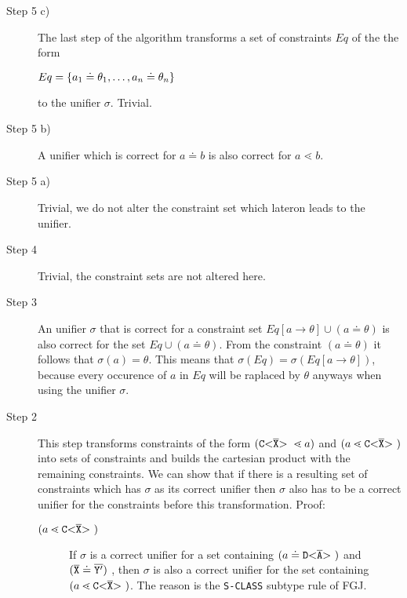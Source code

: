 \documentclass[runningheads]{llncs}
\begin{document}
\begin{description}
\item[Step 5 c)]
The last step of the algorithm transforms a set of constraints $Eq$ of the the form

$Eq = \{ a_1 \doteq \theta_1, \ldots , a_n \doteq \theta_n \}$

to the unifier $\sigma$.
Trivial.

\item[Step 5 b)]
A unifier which is correct for $a \doteq b$ is also correct for $a \lessdot b$.

\item[Step 5 a)]
Trivial, we do not alter the constraint set which lateron leads to the unifier.

\item[Step 4]
Trivial, the constraint sets are not altered here.

\item[Step 3]
An unifier $\sigma$ that is correct for a constraint set
$Eq[a \to \theta] \cup (a \doteq \theta)$ is also correct for
the set $Eq \cup (a \doteq \theta)$.
From the constraint $(a \doteq \theta)$ it follows that $\sigma(a) = \theta$.
This means that $\sigma(Eq) = \sigma(Eq[a \to \theta])$,
because every occurence of $a$ in $Eq$ will be raplaced by $\theta$ anyways when using the unifier $\sigma$.

\item[Step 2]
This step transforms constraints of the form $(\mathtt{C {\tt <} \overline{\tt X} {\tt >} \ } \lessdot a)$ and $(a \lessdot \mathtt{C {\tt <} \overline{\tt X} {\tt >} \ })$
into sets of constraints and builds the cartesian product with the remaining constraints.
We can show that if there is a resulting set of constraints which has $\sigma$ as its correct unifier
then $\sigma$ also has to be a correct unifier for the constraints before this transformation.
Proof:

\begin{description}
\item[$(a \lessdot \mathtt{C {\tt <} \overline{\tt X} {\tt >} \ })$] If $\sigma$ is a correct unifier for a set containing $(a \doteq \mathtt{D {\tt <} \overline{\tt A} {\tt >} \ })$
and $(\overline{\tt X} \doteq \overline{\tt Y'})$
, then $\sigma$ is also a correct unifier for the set containing $(a \lessdot \mathtt{C {\tt <} \overline{\tt X} {\tt >} \ })$.
The reason is the \texttt{S-CLASS} subtype rule of FGJ. %


\end{description}
\end{description}
\end{document}
